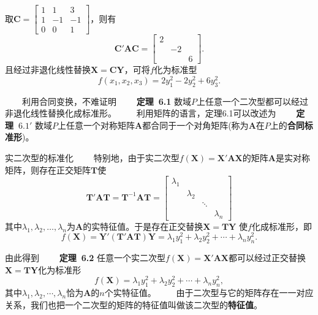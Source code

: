 \documentclass[compress,mathserif,cjk]{beamer}
\theoremstyle{remark}
\numberwithin{equation}{section}
\newcommand{\hei}{\bf}      %
\begin{document}
\begin{CJK}{UTF8}{gbsn}
\begin{frame}
取$\bm C=\left[\begin{matrix}1&1&3\\1&-1&-1\\0&0&1\end{matrix}\right]$，则有
$$\bm C'\bm{AC}=\left[\begin{matrix}2&&\\&-2&\\&&6\end{matrix}\right].$$
且经过非退化线性替换$\bm X=\bm{CY}$，可将$f$化为标准型
$$f(x_1,x_2,x_3)=2y_1^2-2y_2^2+6y_3^2.$$
\end{frame}

\begin{frame}
\ \ \ \ 利用合同变换，不难证明
\vskip 5pt
\ \ \ \ {\hei 定理~6.1} 数域$P$上任意一个二次型都可以经过非退化线性替换化成标准形。
\vskip 5pt
\ \ \ \ 利用矩阵的语言，定理6.1可以改述为
\vskip 5pt
\ \ \ \ {\hei 定理~$6.1'$} 数域$P$上任意一个对称矩阵$\bm A$都合同于一个对角矩阵(称为$\bm A$在$P$上的{\hei 合同标准形})。
\end{frame}

\begin{frame}{实二次型的标准化}
\pause\ \ \ \ 特别地，由于实二次型$f(\bm X)=\bm X'\bm{AX}$的矩阵$\bm A$是实对称矩阵，则存在正交矩阵$\bm T$使
$$\bm T'\bm A\bm T=\bm T^{-1}\bm{AT}=\left[\begin{matrix}\lambda_1&&&\\&\lambda_2&&\\&&\ddots&\\&&&\lambda_n\end{matrix}\right]$$
其中$\lambda_1,\lambda_2,\ldots,\lambda_n$为$\bm A$的实特征值。于是存在正交替换$\bm X=\bm {TY}$ 使$f$化成标准形，即
$$f(\bm X)=\bm Y'(\bm T'\bm{AT})\bm Y=\lambda_1y_1^2+\lambda_2y_2^2+\cdots+\lambda_ny_n^2.$$
\end{frame}

\begin{frame}
由此得到
\vskip 5pt
\ \ \ \ {\hei 定理~6.2} 任意一个实二次型$f(\bm X)=\bm X'\bm{AX}$都可以经过正交替换$\bm X=\bm {TY}$化为标准形
$$f(\bm X)=\lambda_1y_1^2+\lambda_2y_2^2+\cdots+\lambda_ny_n^2,$$
其中$\lambda_1,\lambda_2,\cdots,\lambda_n$恰为$\bm A$的$n$个实特征值。
\pause\vskip 10pt
\ \ \ \ 由于二次型与它的矩阵存在一一对应关系，我们也把一个二次型的矩阵的特征值叫做该二次型的{\hei 特征值}。
\end{frame}


\end{CJK}
\end{document}
